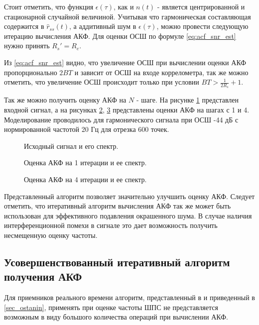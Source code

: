 Стоит отметить, что функция ${\epsilon(\tau)}$, как и ${n(t)}$ - является центрированной и
стационарной случайной величиной.
Учитывая что гармоническая составляющая содержится в ${\hat{r}_{ss}(t)}$, а аддитивный шум в ${\epsilon(\tau)}$, можно провести
следующую итерацию вычисления АКФ. Для оценки ОСШ по формуле \ref{eq:acf_snr_est} нужно принять ${R_s' = R_e}$.

Из \ref{eq:acf_snr_est} видно, что увеличение ОСШ при вычислении оценки АКФ пропорционально ${2BT}$ и зависит от
ОСШ на входе коррелометра, так же можно отметить, что увеличение ОСШ происходит только при условии ${BT > \frac{1}{2R_s} + 1}$.

Так же можно получить оценку АКФ на ${N}$ - шаге. На рисунке \ref{pic:acf_0_iter} представлен входной сигнал, а на
рисунках \ref{pic:acf_1_iter}, \ref{pic:acf_4_iter} представлены оценки АКФ на шагах с 1 и 4.
Моделирование проводилось для гармонического сигнала при ОСШ -44 дБ с нормированной частотой 20 Гц для
отрезка 600 точек.

\begin{figure}[H]
	\center{}
	\caption{Исходный сигнал и его спектр.}
	\label{pic:acf_0_iter}
\end{figure}

\begin{figure}[H]
	\center{}
	\caption{Оценка АКФ на 1 итерации и ее спектр.}
	\label{pic:acf_1_iter}
\end{figure}

\begin{figure}[H]
	\center{}
	\caption{Оценка АКФ на 4 итерации и ее спектр.}
	\label{pic:acf_4_iter}
\end{figure}

Представленный алгоритм позволяет значительно улучшить оценку АКФ. Следует отметить, что итеративный алгоритм вычисления АКФ так же
может быть использован для эффективного подавления окрашенного шума. В случае наличия интерференционной помехи в сигнале это дает
возможность получить несмещенную оценку частоты.

\subsection{Усовершенствованный итеративный алгоритм получения АКФ}
\label{sec_acf_fft}
Для приемников реального времени алгоритм, представленный в \cite{ostanin_akf} и приведенный в \ref{sec_ostanin}, применять при оценке 
частоты ШПС не представляется возможным в виду большого количества операций при вычислении АКФ.

